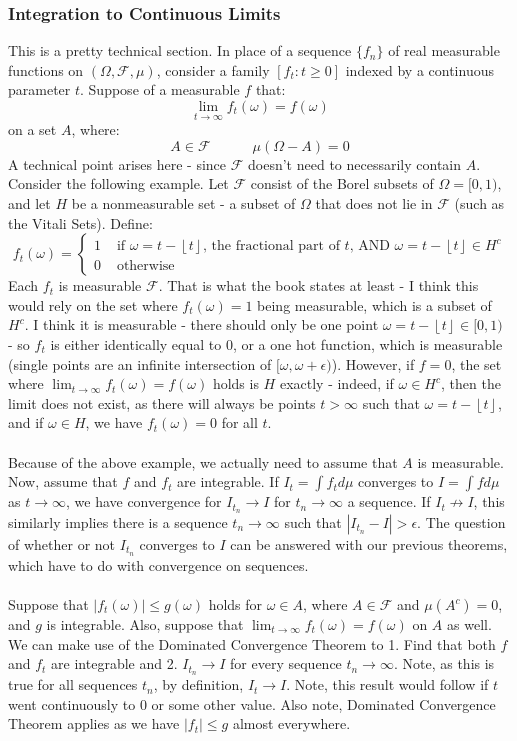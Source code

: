 \documentclass[12pt,a4paper]{article}
\newcommand{\1}[1]{\mathbbm{1}\left\{ #1 \right\}}
\newcommand{\fcal}{\mathcal{F}}
\newcommand{\floor}[1]{\left\lfloor #1 \right\rfloor}
\begin{document}
\subsubsection{Integration to Continuous Limits} This is a pretty technical section. In place of a sequence $\{f_n\}$ of real measurable functions on $(\Omega,\fcal,\mu)$, consider a family $[f_t: t \geq 0]$ indexed by a continuous parameter $t$. Suppose of a measurable $f$ that:
$$
	\lim_{t \to \infty} f_t(\omega) = f(\omega)
$$
on a set $A$, where:
$$
	A \in \fcal \quad\quad\quad
	\mu(\Omega - A) = 0
$$
A technical point arises here - since $\fcal$ doesn't need to necessarily contain $A$. Consider the following example. Let $\fcal$ consist of the Borel subsets of $\Omega = [0,1)$, and let $H$ be a nonmeasurable set - a subset of $\Omega$ that does not lie in $\fcal$ (such as the Vitali Sets). Define:
$$
	f_t(\omega) =
	\begin{cases}
	1 & \text{ if $\omega = t - \floor{t}$, the fractional part of $t$, AND $\omega = t - \floor{t} \in H^c$}\\
	0 & \text{ otherwise}
	\end{cases}
$$
Each $f_t$ is measurable $\fcal$. That is what the book states at least - I think this would rely on the set where $f_t(\omega) = 1$ being measurable, which is a subset of $H^c$. I think it is measurable - there should only be one point $\omega = t - \floor{t} \in [0,1)$ - so $f_t$ is either identically equal to 0, or a one hot function, which is measurable (single points are an infinite intersection of $[\omega,\omega+\epsilon)$). However, if $f = 0$, the set where $\lim_{t \to \infty} f_t(\omega) = f(\omega)$ holds is $H$ exactly - indeed, if $\omega \in H^c$, then the limit does not exist, as there will always be points $t > \infty$ such that $\omega = t - \floor{t}$, and if $\omega \in H$, we have $f_t(\omega) = 0$ for all $t$. 
\\\\
Because of the above example, we actually need to assume that $A$ is measurable. Now, assume that $f$ and $f_t$ are integrable. If $I_t = \int f_t d\mu$ converges to $I = \int f d\mu$ as $t \to \infty$, we have convergence for $I_{t_n} \to I$ for $t_n \to \infty$ a sequence. If $I_t \not\to I$, this similarly implies there is a sequence $t_n \to \infty$ such that $|I_{t_n} - I| > \epsilon$. The question of whether or not $I_{t_n}$ converges to $I$ can be answered with our previous theorems, which have to do with convergence on sequences.
\\\\
Suppose that $|f_t(\omega)| \leq g(\omega)$ holds for $\omega \in A$, where $A \in \fcal$ and $\mu(A^c) = 0$, and $g$ is integrable. Also, suppose that $\lim_{t \to \infty} f_t(\omega) = f(\omega)$ on $A$ as well. We can make use of the Dominated Convergence Theorem to 1. Find that both $f$ and $f_t$ are integrable and 2. $I_{t_n} \to I$ for every sequence $t_n \to \infty$. Note, as this is true for all sequences $t_n$, by definition, $I_t \to I$. Note, this result would follow if $t$ went continuously to $0$ or some other value. Also note, Dominated Convergence Theorem applies as we have $|f_t| \leq g$ almost everywhere.
\end{document}
